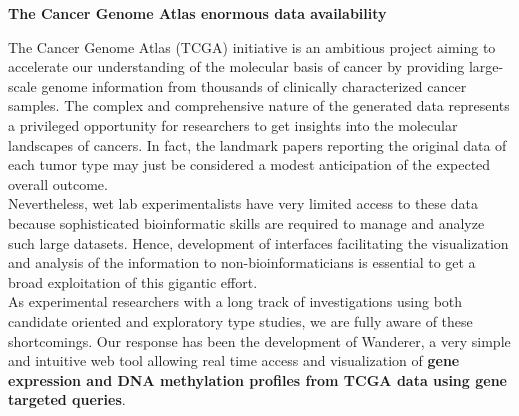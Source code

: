 \documentclass[a0,portrait]{a0poster}
\newenvironment{Section}[1]{
\par 
\flushleft
\colorbox{boxcol}{ 				%
\sffamily\large\color{black} #1%
\hspace{0.5cm}}
\par\nobreak 
\nointerlineskip 						%
\setlength\parskip{-1pt}					%
\begin{lrbox}\envbox						%
\begin{minipage}{0.95\columnwidth}		%
}
{\par
\end{minipage}\end{lrbox}				%
\fcolorbox{boxcol}{fillcol}{\usebox\envbox}	%
\vspace{1cm}							%
}
\begin{document}
\begin{multicols}{2} %



\vspace{-14cm}

\begin{Section}{\textbf{The Cancer Genome Atlas enormous data availability}}

The Cancer Genome Atlas (TCGA) initiative is an ambitious project aiming to accelerate our understanding of the molecular basis of cancer by providing large-scale genome information from thousands of clinically characterized cancer samples. The complex and comprehensive  nature of the generated data represents a privileged opportunity for researchers to get insights into the molecular landscapes of cancers. In fact, the landmark papers reporting the original data of each tumor type may just be considered a modest anticipation of the expected overall outcome.\\

Nevertheless,  wet lab experimentalists have very limited access to these data because sophisticated bioinformatic skills are required to manage and analyze such large datasets. Hence, development of interfaces facilitating the visualization and analysis of the information to non-bioinformaticians is essential to get a broad exploitation of this gigantic effort.\\


As experimental researchers with a long track of investigations using both candidate oriented and exploratory type studies, we are fully aware of these shortcomings. Our response has been the development of Wanderer, a very simple and intuitive web tool allowing real time access and visualization of \textbf{gene expression and DNA methylation profiles from TCGA data using gene targeted queries}.\\



\end{Section}
\end{multicols}
\end{document}
